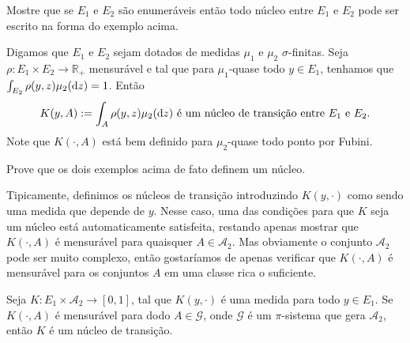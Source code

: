 \begin{exercise}
  Mostre que se $E_1$ e $E_2$ são enumeráveis então todo núcleo entre $E_1$ e $E_2$ pode ser escrito na forma do exemplo acima.
\end{exercise}

\begin{example}
  Digamos que $E_1$ e $E_2$ sejam dotados de medidas $\mu_1$ e $\mu_2$ $\sigma$-finitas.
  Seja $\rho: E_1 \times E_2 \to \mathbb{R}_+$ mensurável e tal que para $\mu_1$-quase todo $y \in E_1$, tenhamos que $\int_{E_2} \rho(y, z) \mu_2(\mathop{}\!\mathrm{d} z) = 1$.
  Então
  \begin{equation}
    K(y, A) := \int_A \rho(y, z) \mu_2(\mathop{}\!\mathrm{d} z) \text{ é um núcleo de transição entre $E_1$ e $E_2$.}
  \end{equation}
  Note que $K(\cdot, A)$ está bem definido para $\mu_2$-quase todo ponto por Fubini.
\end{example}

\begin{exercise}
  Prove que os dois exemplos acima de fato definem um núcleo.
\end{exercise}

Tipicamente, definimos os núcleos de transição introduzindo $K(y, \cdot)$ como sendo uma medida que depende de $y$.
Nesse caso, uma das condições para que $K$ seja um núcleo está automaticamente satisfeita, restando apenas mostrar que $K(\cdot, A)$ é mensurável para quaisquer $A \in \mathcal{A}_2$.
Mas obviamente o conjunto $\mathcal{A}_2$ pode ser muito complexo, então gostaríamos de apenas verificar que $K(\cdot, A)$ é mensurável para os conjuntos $A$ em uma classe rica o suficiente.

\begin{proposition}
  \label{p:K_nucleo_na_classe}
  Seja $K:E_1 \times \mathcal{A}_2 \to [0,1]$, tal que $K(y, \cdot)$ é uma medida para todo $y \in E_1$.
  Se $K(\cdot, A)$ é mensurável para dodo $A \in \mathcal{G}$, onde $\mathcal{G}$ é um $\pi$-sistema que gera $\mathcal{A}_2$, então $K$ é um núcleo de transição.
\end{proposition}

